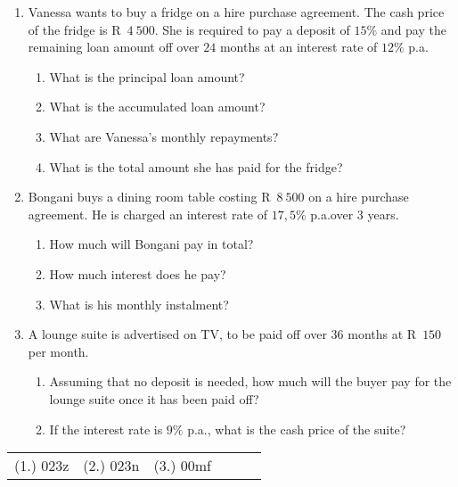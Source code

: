 \begin{exercises}{}{
    \begin{enumerate}[label=\textbf{\arabic*}.]
	\item Vanessa wants to buy a fridge on a hire purchase agreement. The cash price of the fridge is R~$4~500$. She is required to pay a deposit of $15\%$ and pay the remaining loan amount off over $24$ months at an interest rate of $12\%$ p.a.
	\begin{enumerate}[noitemsep, label=\textbf{(\alph*)} ]
	    \item What is the principal loan amount?
	    \item What is the accumulated loan amount?
	    \item What are Vanessa's monthly repayments?
	    \item What is the total amount she has paid for the fridge?
	\end{enumerate}


	\item Bongani buys a dining room table costing R~$8~500$ on a
          hire purchase agreement. He is charged an interest rate of
          $17,5\%$ p.a.\@ over $3$ years.
	\begin{enumerate}[noitemsep, label=\textbf{(\alph*)} ]
	    \item How much will Bongani pay in total?
	    \item How much interest does he pay?
	    \item What is his monthly instalment?
	\end{enumerate}

	\item A lounge suite is advertised on TV, to be paid off over $36$ months at R~$150$ per month.
	\begin{enumerate}[noitemsep, label=\textbf{(\alph*)} ]
	    \item Assuming that no deposit is needed, how much will the buyer pay for the lounge suite once it has been paid off?
	    \item If the interest rate is $9\%$ p.a., what is the cash price of the suite?\\
	\end{enumerate}
    \end{enumerate}
\practiceinfo

\begin{tabular}[h]{cccccc}
	(1.) 023z	&	(2.) 023n &	(3.) 00mf
    \end{tabular}
}
\end{exercises}


